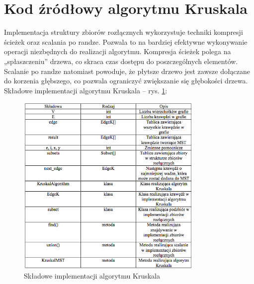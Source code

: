 \newpage
\section{Kod źródłowy algorytmu Kruskala}
Implementacja struktury zbiorów rozłącznych wykorzystuje techniki kompresji ścieżek oraz scalania po randze. Pozwala to na bardziej efektywne wykonywanie operacji niezbędnych do realizacji algorytmu. Kompresja ścieżek polega na „spłaszczeniu” drzewa, co skraca czas dostępu do poszczególnych elementów. Scalanie po randze natomiast powoduje, że płytsze drzewo jest zawsze dołączane do korzenia głębszego, co pozwala ograniczyć zwiększanie się głębokości drzewa.\\
Składowe implementacji algorytmu Kruskala -- rys. \ref{fig: sk}:\\
\begin{figure}[htb!]
	\centering
	\includegraphics[width=0.8\textwidth]{tex/fig/skladowe_kruskal}
	\caption{Składowe implementacji algorytmu Kruskala}
	\label{fig: sk}
\end{figure}

